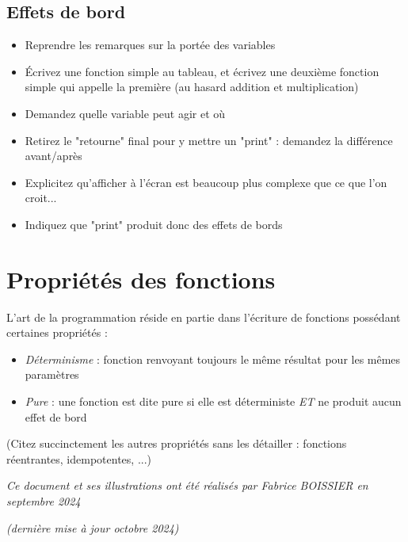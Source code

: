 \documentclass[11pt,a4paper]{article}
\begin{document}
\subsection{Effets de bord}

\begin{itemize}
\item Reprendre les remarques sur la portée des variables
\item \'Ecrivez une fonction simple au tableau, et écrivez une deuxième fonction simple qui appelle la première (au hasard addition et multiplication)
\item Demandez quelle variable peut agir et où
\item Retirez le "retourne" final pour y mettre un "print" : demandez la différence avant/après
\item Explicitez qu'afficher à l'écran est beaucoup plus complexe que ce que l'on croit...
\item Indiquez que "print" produit donc des effets de bords
\end{itemize}



\section{Propriétés des fonctions}

L'art de la programmation réside en partie dans l'écriture de fonctions possédant certaines propriétés :

\begin{itemize}
\item \textit{Déterminisme} : fonction renvoyant toujours le même résultat pour les mêmes paramètres

\item \textit{Pure} : une fonction est dite pure si elle est déterministe \textit{ET} ne produit aucun effet de bord
\end{itemize}

(Citez succinctement les autres propriétés sans les détailler : fonctions réentrantes, idempotentes, ...)




\bigskip

\vfillFirst

\vfillLast

\begin{center}
\textit{Ce document et ses illustrations ont été réalisés par Fabrice BOISSIER en septembre 2024}

\textit{(dernière mise à jour octobre 2024)}
\end{center}
\end{document}

